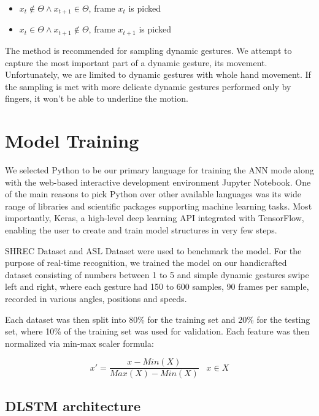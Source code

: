 \begin{enumerate}
\begin{itemize}
        \item $x_{t} \notin \Theta \land x_{t+1} \in \Theta$, frame $x_t$ is picked
        \item $x_{t} \in \Theta \land x_{t+1} \notin \Theta$, frame $x_{t+1}$ is picked
    \end{itemize}
    
    The method is recommended for sampling dynamic gestures. We attempt to capture the most important part of a dynamic gesture, its movement. Unfortunately, we are limited to dynamic gestures with whole hand movement. If the sampling is met with more delicate dynamic gestures performed only by fingers, it won't be able to underline the motion.
\end{enumerate}


\section{Model Training}

We selected Python to be our primary language for training the ANN mode along with the web-based interactive development environment Jupyter Notebook. One of the main reasons to pick Python over other available languages was its wide range of libraries and scientific packages supporting machine learning tasks. Most importantly, Keras, a high-level deep learning API integrated with TensorFlow, enabling the user to create and train model structures in very few steps.

SHREC Dataset and ASL Dataset were used to benchmark the model. For the purpose of real-time recognition, we trained the model on our handicrafted dataset consisting of numbers between 1 to 5 and simple dynamic gestures swipe left and right, where each gesture had 150 to 600 samples, 90 frames per sample, recorded in various angles, positions and speeds. 

Each dataset was then split into 80\% for the training set and 20\% for the testing set, where 10\% of the training set was used for validation. Each feature was then normalized via min-max scaler formula:

\begin{equation}
    { x' = \frac{x - Min(X)}{Max(X)-Min(X)}\;\;\; x \in X}
\end{equation}

\subsection{DLSTM architecture}

